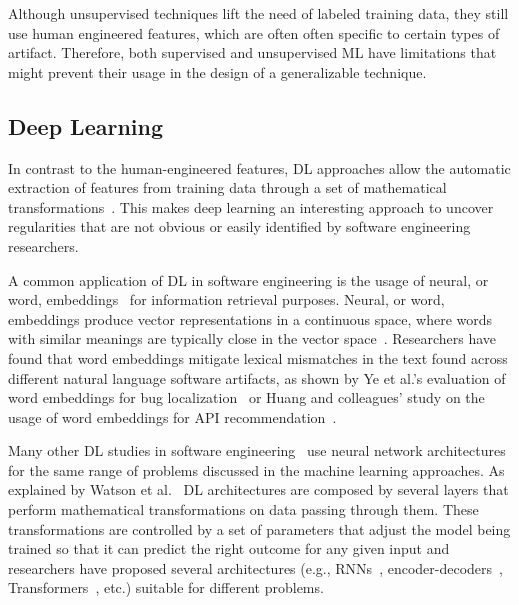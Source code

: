 Although unsupervised techniques lift the need of labeled training data,
they still use human engineered features, 
which are often often specific to certain 
types of artifact. Therefore, 
both supervised and unsupervised \acs{ML}
have limitations that might prevent their usage 
in the design of a generalizable technique.




\subsection{Deep Learning }
\label{cp2:deep-learning}



In contrast to the human-engineered features,
\acf{DL} approaches allow the automatic extraction of features 
from training data through a set of mathematical transformations~\cite{Deng2018, zhang2021deep}.
This makes 
deep learning an interesting 
approach to
uncover regularities 
that are not obvious or easily identified
by software engineering researchers.



A common application of \acs{DL} in software engineering is the usage of neural, or word, embeddings~\cite{Mikolov2013}
for information retrieval purposes. 
Neural, or word, embeddings produce vector representations in a continuous space,
where words with similar meanings are typically close in the vector space~\cite{harris1954distributional, mikolov2013efficient}. 
Researchers have found that word
embeddings mitigate lexical mismatches in the text found across different 
natural language software artifacts,
as shown by Ye et al.'s evaluation of word embeddings
for bug localization~\cite{Ye2016}
or Huang and colleagues' study on 
the usage of word embeddings for API recommendation~\cite{Huang2018}.



Many other \acs{DL} studies in software engineering~\cite{ferreira2021,li2018deep}
use neural network architectures 
for the same range of problems discussed in the machine learning approaches.
As explained by Watson et al.~\cite{watson2022}
\acs{DL} architectures are composed by several layers 
that perform mathematical transformations on data passing through them. 
These transformations are controlled by a set of parameters that 
adjust the model being trained so that it can predict 
the right outcome for any given input
and researchers have proposed 
several architectures (e.g., \acs{RNN}s~\cite{rumelhart1986rnn, sutskever2014seq2seq}, encoder-decoders~\cite{bahdanau2014neural}, Transformers~\cite{Vaswani2017attention}, etc.) 
suitable for different problems. 



